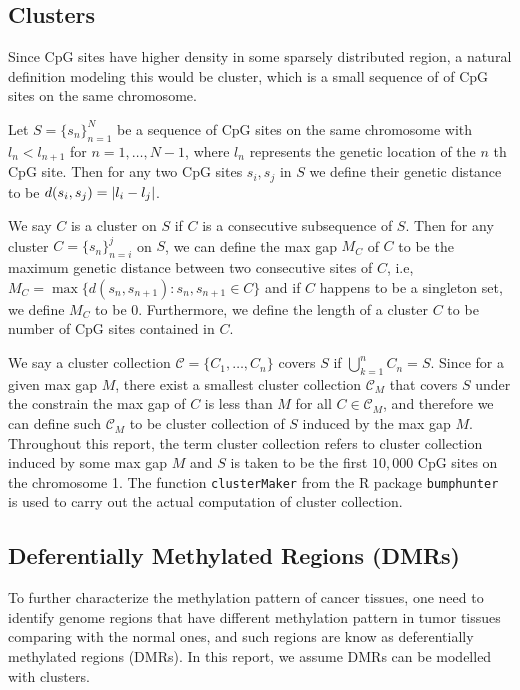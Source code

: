 \documentclass{report}
\begin{document}
\subsection{Clusters} \label{section: clusters}
\par
Since CpG sites have higher density in some sparsely distributed region, a natural definition modeling this would be cluster, which is a small sequence of of CpG sites on the same chromosome.
\par
Let $S = \{s_n\}_{n=1}^N$ be a sequence of CpG sites on the same chromosome with $l_n < l_{n+1}$ for $n =1,\ldots,N-1$,
where $l_n$ represents the genetic location of the $n$ th CpG site. Then for any two CpG sites $s_i, s_j$ in $S$
we define their genetic distance to be $d(s_i, s_j) = \abs{l_i - l_j}$. 
\par
We say $C$ is a cluster on $S$ if $C$ is a consecutive subsequence of $S$. Then for any cluster $C = \{s_n\}_{n=i}^j$ on  $S$, we can define the max gap $M_C$ of $C$ to be the maximum 
genetic distance between two consecutive  sites of $C$, i.e, $M_C = \max\{ d(s_n, s_{n+1}) : s_n, s_{n+1} \in C \}$ and if $C$ happens to be a singleton set, we define $M_C$ to be $0$.
Furthermore, we define the length of a cluster $C$ to be number of CpG sites contained in $C$.

\par
We say a cluster collection $\mathcal{C} = \{C_1,\ldots,C_n\}$ covers $S$ if $\bigcup_{k=1}^n C_n = S$.
Since for a given max gap $M$, there exist a smallest cluster collection $\mathcal{C}_M$ that covers $S$ under the constrain 
the max gap of $C$ is less than $M$ for all $C \in \mathcal{C}_M$, and therefore we can define such $\mathcal{C}_M$ to be
cluster collection of $S$ induced by the max gap $M$.
Throughout this report, the term cluster collection refers to cluster collection induced by some max gap $M$ and $S$ is taken to be the first $10,000$ CpG sites on the chromosome 1.
The function \verb|clusterMaker| from the R package \verb|bumphunter| \cite{bumphunter,minfi} is used to carry out the actual computation of cluster collection.

\subsection{Deferentially Methylated Regions (DMRs)}
\par
To further characterize the methylation pattern of cancer tissues, one need to identify genome regions that have different methylation pattern in tumor tissues comparing with the normal ones,
and such regions are know as deferentially methylated regions (DMRs). In this report, we assume DMRs can be modelled with clusters. 
\end{document}
